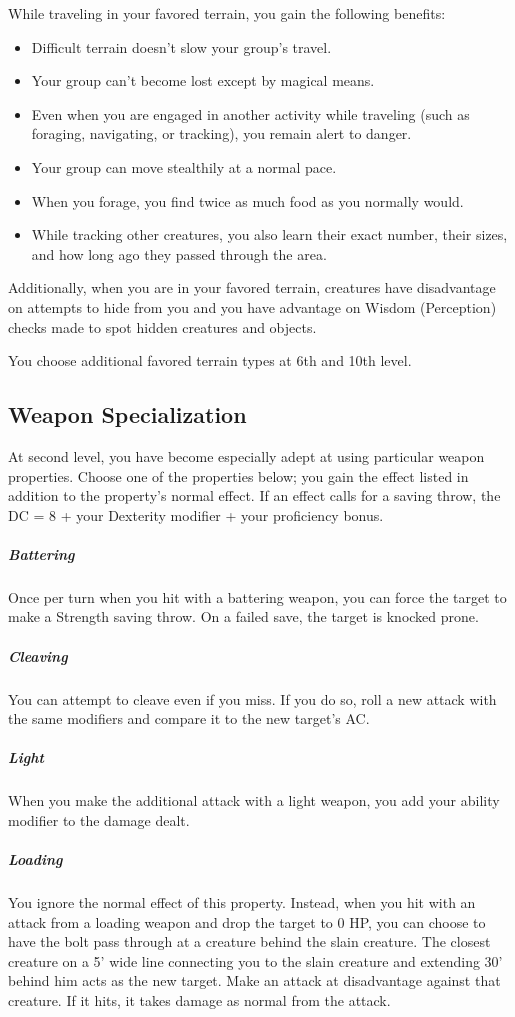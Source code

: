 While traveling in your favored terrain, you gain the following benefits:
\begin{itemize}
\item Difficult terrain doesn't slow your group's travel.
\item Your group can't become lost except by magical means.
\item Even when you are engaged in another activity while traveling (such as foraging, navigating, or tracking), you remain alert to danger.
\item Your group can move stealthily at a normal pace.
\item When you forage, you find twice as much food as you normally would.
\item While tracking other creatures, you also learn their exact number, their sizes, and how long ago they passed through the area.
\end{itemize}

Additionally, when you are in your favored terrain, creatures have disadvantage on attempts to hide from you and you have advantage on Wisdom (Perception) checks made to spot hidden creatures and objects.

You choose additional favored terrain types at 6th and 10th level.

\subsection{Weapon Specialization}

At second level, you have become especially adept at using particular weapon properties. Choose one of the properties below; you gain the effect listed in addition to the property's normal effect. If an effect calls for a saving throw, the DC = 8 + your Dexterity modifier + your proficiency bonus.

\subparagraph*{Battering} Once per turn when you hit with a battering weapon, you can force the target to make a Strength saving throw. On a failed save, the target is knocked prone.

\subparagraph*{Cleaving} You can attempt to cleave even if you miss. If you do so, roll a new attack with the same modifiers and compare it to the new target's AC.

\subparagraph*{Light} When you make the additional attack with a light weapon, you add your ability modifier to the damage dealt.

\subparagraph*{Loading} You ignore the normal effect of this property. Instead, when you hit with an attack from a loading weapon and drop the target to 0 HP, you can choose to have the bolt pass through at a creature behind the slain creature. The closest creature on a 5' wide line connecting you to the slain creature and extending 30' behind him acts as the new target. Make an attack at disadvantage against that creature. If it hits, it takes damage as normal from the attack.


